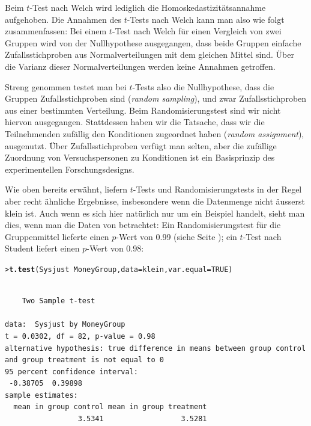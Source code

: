 \documentclass[oneside, 10pt]{book}\usepackage[]{graphicx}\usepackage[]{xcolor}
\makeatletter
\newcommand{\hlnum}[1]{\textcolor[rgb]{0.686,0.059,0.569}{#1}}%
\newcommand{\hlopt}[1]{\textcolor[rgb]{0,0,0}{#1}}%
\newcommand{\hlstd}[1]{\textcolor[rgb]{0.345,0.345,0.345}{#1}}%
\newcommand{\hlkwc}[1]{\textcolor[rgb]{0.333,0.667,0.333}{#1}}%
\newcommand{\hlkwd}[1]{\textcolor[rgb]{0.737,0.353,0.396}{\textbf{#1}}}%
\newenvironment{kframe}{%
 \def\at@end@of@kframe{}%
 \ifinner\ifhmode%
  \def\at@end@of@kframe{\end{minipage}}%
  \begin{minipage}{\columnwidth}%
 \fi\fi%
 \def\FrameCommand##1{\hskip\@totalleftmargin \hskip-\fboxsep
 \colorbox{shadecolor}{##1}\hskip-\fboxsep
     \hskip-\linewidth \hskip-\@totalleftmargin \hskip\columnwidth}%
 \MakeFramed {\advance\hsize-\width
   \@totalleftmargin\z@ \linewidth\hsize
   \@setminipage}}%
 {\par\unskip\endMakeFramed%
 \at@end@of@kframe}
\newenvironment{knitrout}{}{} %
\makeatother
\begin{document}
Beim $t$-Test nach Welch wird lediglich die Homoskedastizitätsannahme
aufgehoben. Die Annahmen des $t$-Tests nach Welch kann man also wie folgt
zusammenfassen:
Bei einem $t$-Test nach Welch für einen Vergleich von zwei Gruppen
wird von der Nullhypothese ausgegangen, dass beide Gruppen
einfache Zufallsstichproben aus Normalverteilungen mit dem gleichen
Mittel sind. Über die Varianz
dieser Normalverteilungen werden keine Annahmen getroffen.

Streng genommen testet man bei $t$-Tests also die Nullhypothese,
dass die Gruppen Zufallsstichproben sind (\textit{random sampling}),
und zwar Zufallsstichproben aus einer bestimmten Verteilung.
Beim Randomisierungstest sind wir nicht hiervon ausgegangen.
Stattdessen haben wir die Tatsache, dass wir die Teilnehmenden
zufällig den Konditionen zugeordnet haben (\textit{random assignment}),
ausgenutzt. Über Zufallsstichproben verfügt man selten, aber
die zufällige Zuordnung von Versuchspersonen zu Konditionen
ist ein Basisprinzip des experimentellen For\-schungs\-de\-signs.

Wie oben bereits erwähnt, liefern $t$-Tests und
Randomisierungstests in der Regel aber recht ähnliche Ergebnisse, insbesondere
wenn die Datenmenge nicht äusserst klein ist.
Auch wenn es sich hier natürlich nur um ein Beispiel handelt,
sieht man dies, wenn man die Daten von \citet{Klein2014} betrachtet:
Ein Randomisierungstest für die Gruppenmittel lieferte einen $p$-Wert von
0.99 (siehe Seite \pageref{page:kleinrandom});
ein $t$-Test nach Student liefert einen $p$-Wert von 0.98:

\begin{knitrout}
\color{fgcolor}\begin{kframe}
\begin{alltt}
\hlstd{> }\hlkwd{t.test}\hlstd{(Sysjust} \hlopt{~} \hlstd{MoneyGroup,} \hlkwc{data} \hlstd{= klein,} \hlkwc{var.equal} \hlstd{=} \hlnum{TRUE}\hlstd{)}
\end{alltt}
\begin{verbatim}

	Two Sample t-test

data:  Sysjust by MoneyGroup
t = 0.0302, df = 82, p-value = 0.98
alternative hypothesis: true difference in means between group control and group treatment is not equal to 0
95 percent confidence interval:
 -0.38705  0.39898
sample estimates:
  mean in group control mean in group treatment 
                 3.5341                  3.5281 
\end{verbatim}
\end{kframe}
\end{knitrout}
\end{document}

